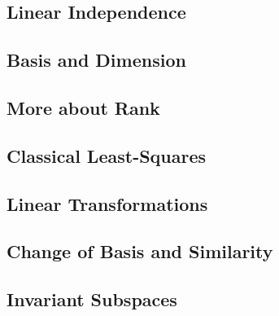 \documentclass[12pt]{article}
\begin{document}
\subsection{Linear Independence}
\subsection{Basis and Dimension}
\subsection{More about Rank}
\subsection{Classical Least-Squares}
\subsection{Linear Transformations}
\subsection{Change of Basis and Similarity}
\subsection{Invariant Subspaces}
\end{document}
